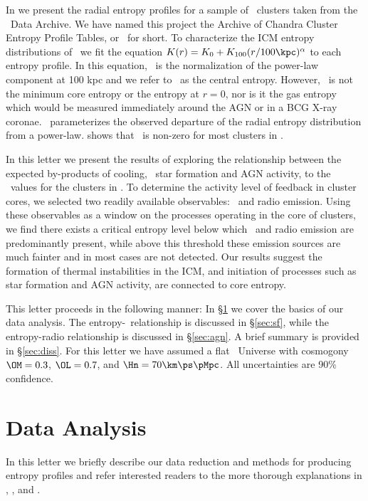\documentclass{emulateapj}
\begin{document}
In \cite{accept} we present the radial entropy profiles for a sample
of \clnum\ clusters taken from the \Chandra\ Data Archive. We have
named this project the Archive of Chandra Cluster Entropy Profile
Tables, or \accept\ for short. To characterize the ICM entropy
distributions of \accept\ we fit the equation $K(r) = K_0
+K_{100}(r/100 \kpc)^{\alpha}$ to each entropy profile. In this
equation, \khun\ is the normalization of the power-law component at
100 kpc and we refer to \kna\ as the central entropy. However,
\kna\ is not the minimum core entropy or the entropy at $r=0$, nor is
it the gas entropy which would be measured immediately around the AGN
or in a BCG X-ray coronae. \kna\ parameterizes the observed departure
of the radial entropy distribution from a power-law. \cite{accept}
shows that \kna\ is non-zero for most clusters in \accept.

In this letter we present the results of exploring the relationship
between the expected by-products of cooling, \eg\ star formation and
AGN activity, to the \kna\ values for the clusters in \accept. To
determine the activity level of feedback in cluster cores, we selected
two readily available observables: \halpha\ and radio emission. Using
these observables as a window on the processes operating in the core
of clusters, we find there exists a critical entropy level below which
\halpha\ and radio emission are predominantly present, while above
this threshold these emission sources are much fainter and in most
cases are not detected. Our results suggest the formation of thermal
instabilities in the ICM, and initiation of processes such as star
formation and AGN activity, are connected to core entropy.

This letter proceeds in the following manner: In \S\ref{sec:data} we
cover the basics of our data analysis. The
entropy-\halpha\ relationship is discussed in \S\ref{sec:sf}, while
the entropy-radio relationship is discussed in \S\ref{sec:agn}. A
brief summary is provided in \S\ref{sec:diss}.  For this letter we
have assumed a flat \LCDM\ Universe with cosmogony $\OM=0.3$,
$\OL=0.7$, and $\Hn=70\km\ps\pMpc$. All uncertainties are 90\%
confidence.

\section{Data Analysis}
\label{sec:data}

In this letter we briefly describe our data reduction and methods for
producing entropy profiles and refer interested readers to the more
thorough explanations in \cite{d06}, \cite{accept}, and
\cite{xrayband}.
\end{document}
